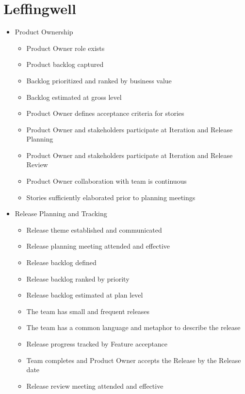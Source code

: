 \begin{appendices}
\begin{itemize}
\end{itemize}




\chapter{Leffingwell}
\label{sec:team_agility_assessment}

\begin{itemize}
	\item Product Ownership
		\begin{itemize}
			\item Product Owner role exists 
			\item Product backlog captured 
			\item Backlog prioritized and ranked by business value 
			\item Backlog estimated at gross level 
			\item Product Owner defines acceptance criteria for stories 
			\item Product Owner and stakeholders participate at Iteration and Release Planning 
			\item Product Owner and stakeholders participate at Iteration and Release Review 
			\item Product Owner collaboration with team is continuous 
			\item Stories sufficiently elaborated prior to planning meetings
		\end{itemize}
	\item Release Planning and Tracking
		\begin{itemize}
			\item Release theme established and communicated 
			\item Release planning meeting attended and effective 
			\item Release backlog defined 
			\item Release backlog ranked by priority 
			\item Release backlog estimated at plan level 
			\item The team has small and frequent releases
			\item The team has a common language and metaphor to describe the release
			\item Release progress tracked by Feature acceptance
			\item Team completes and Product Owner accepts the Release by the Release date
			\item Release review meeting attended and effective

\end{itemize}
\end{itemize}
\end{appendices}

